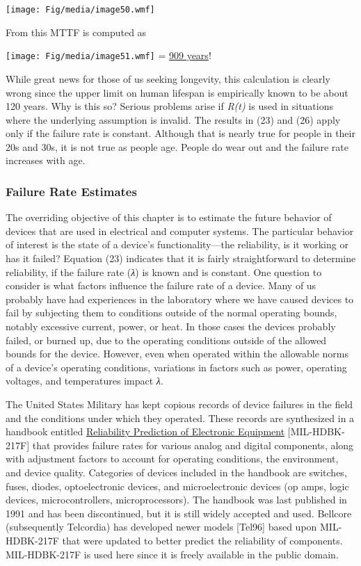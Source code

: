\texttt{[image: Fig/media/image50.wmf]}

From this MTTF is computed as

\texttt{[image: Fig/media/image51.wmf]} = \ul{909 years}!

While great news for those of us seeking longevity, this calculation is
clearly wrong since the upper limit on human lifespan is empirically
known to be about 120 years. Why is this so? Serious problems arise if
\emph{R(t)} is used in situations where the underlying assumption is
invalid. The results in (23) and (26) apply only if the failure rate is
constant. Although that is nearly true for people in their 20s and 30s,
it is not true as people age. People do wear out and the failure rate
increases with age.

\subsubsection{Failure Rate Estimates}\label{failure-rate-estimates}

The overriding objective of this chapter is to estimate the future
behavior of devices that are used in electrical and computer systems.
The particular behavior of interest is the state of a device's
functionality---the reliability, is it working or has it failed?
Equation (23) indicates that it is fairly straightforward to determine
reliability, if the failure rate (\emph{λ}) is known and is constant.
One question to consider is what factors influence the failure rate of a
device. Many of us probably have had experiences in the laboratory where
we have caused devices to fail by subjecting them to conditions outside
of the normal operating bounds, notably excessive current, power, or
heat. In those cases the devices probably failed, or burned up, due to
the operating conditions outside of the allowed bounds for the device.
However, even when operated within the allowable norms of a device's
operating conditions, variations in factors such as power, operating
voltages, and temperatures impact \emph{λ}.

The United States Military has kept copious records of device failures
in the field and the conditions under which they operated. These records
are synthesized in a handbook entitled \ul{Reliability Prediction of
Electronic Equipment} {[}MIL-HDBK-217F{]} that provides failure rates
for various analog and digital components, along with adjustment factors
to account for operating conditions, the environment, and device
quality. Categories of devices included in the handbook are switches,
fuses, diodes, optoelectronic devices, and microelectronic devices (op
amps, logic devices, microcontrollers, microprocessors). The handbook
was last published in 1991 and has been discontinued, but it is still
widely accepted and used. Bellcore (subsequently Telcordia) has
developed newer models {[}Tel96{]} based upon MIL-HDBK-217F that were
updated to better predict the reliability of components. MIL-HDBK-217F
is used here since it is freely available in the public domain.

